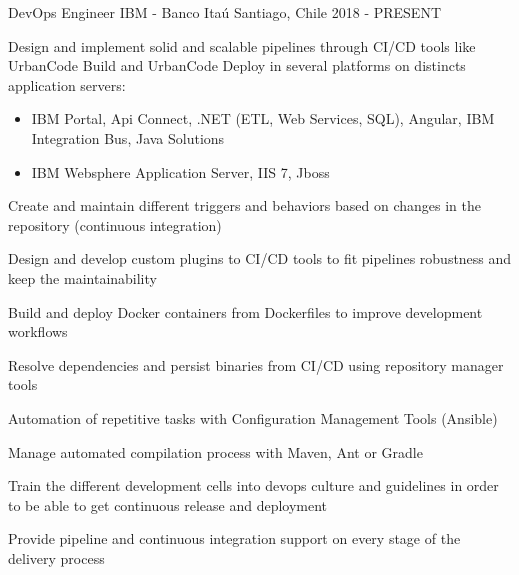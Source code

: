 

\begin{cventries}

  \cventry
  {DevOps Engineer} %
  {IBM - Banco Itaú} %
  {Santiago, Chile} %
  {2018 - PRESENT} %
  {
    \begin{cvitems} %
      \item {Design and implement solid and scalable pipelines through CI/CD tools like UrbanCode Build and UrbanCode Deploy in several platforms on distincts application servers:}
        \begin{itemize}
          \item {IBM Portal, Api Connect, .NET (ETL, Web Services, SQL), Angular, IBM Integration Bus, Java Solutions}
          \item {IBM Websphere Application Server, IIS 7, Jboss}
        \end{itemize}
      \item {Create and maintain different triggers and behaviors based on changes in the repository (continuous integration) }
      \item {Design and develop custom plugins to CI/CD tools to fit pipelines robustness and keep the maintainability}
      \item {Build and deploy Docker containers from Dockerfiles to improve development workflows}
      \item {Resolve dependencies and persist binaries from CI/CD using repository manager tools}
      \item {Automation of repetitive tasks with Configuration Management Tools (Ansible)}
      \item {Manage automated compilation process with Maven, Ant or Gradle}
      \item {Train the different development cells into devops culture and guidelines in order to be able to get continuous release and deployment}
      \item {Provide pipeline and continuous integration support on every stage of the delivery process}

\end{cvitems}}
\end{cventries}
